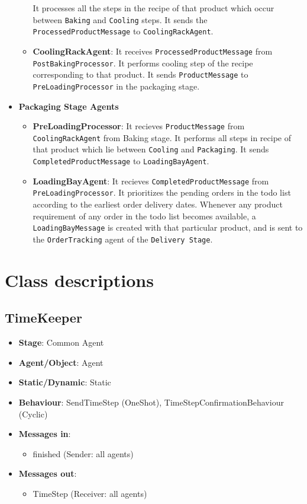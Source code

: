 \documentclass[12pt]{article}
\begin{document}
\begin{itemize}
\begin{itemize}
 It processes all the steps in the recipe of that product which occur between \texttt{Baking} and \texttt{Cooling} steps. 
 It sends the \texttt{ProcessedProductMessage} to \texttt{CoolingRackAgent}.
    \item \textbf{CoolingRackAgent}:
 It receives \texttt{ProcessedProductMessage} from \texttt{PostBakingProcessor}.
 It performs cooling step of the recipe corresponding to that product.
 It sends \texttt{ProductMessage} to \texttt{PreLoadingProcessor} in the packaging stage.
\end{itemize}
\item \textbf{Packaging Stage Agents}
\begin{itemize}
    \item \textbf{PreLoadingProcessor}:
 It recieves \texttt{ProductMessage} from \texttt{CoolingRackAgent} from Baking stage.
 It performs all steps in recipe of that product which lie between \texttt{Cooling} and \texttt{Packaging}.
 It sends \texttt{CompletedProductMessage} to \texttt{LoadingBayAgent}.
    \item \textbf{LoadingBayAgent}:
 It recieves \texttt{CompletedProductMessage} from \texttt{PreLoadingProcessor}.
 It prioritizes the pending orders in the todo list according to the earliest order delivery dates. 
 Whenever any product requirement of any order in the todo list becomes available, a \texttt{LoadingBayMessage} is created with that particular product, and is sent to the \texttt{OrderTracking} agent of the \texttt{Delivery Stage}.   
\end{itemize}
\end{itemize}


\newpage{}
\section{Class descriptions}%
\label{sec:agent_descriptions}

\subsection{TimeKeeper}
\begin{itemize}
    \item \textbf{Stage}: Common Agent
    \item \textbf{Agent/Object}: Agent
    \item \textbf{Static/Dynamic}: Static
    \item \textbf{Behaviour}: SendTimeStep (OneShot), TimeStepConfirmationBehaviour (Cyclic)
    \item \textbf{Messages in}: 
        \begin{itemize}
            \item  finished (Sender: all agents)
        \end{itemize}
    \item \textbf{Messages out}:
        \begin{itemize}
            \item  TimeStep (Receiver: all agents)
        \end{itemize}
\end{itemize}
\newpage{}
\end{document}
